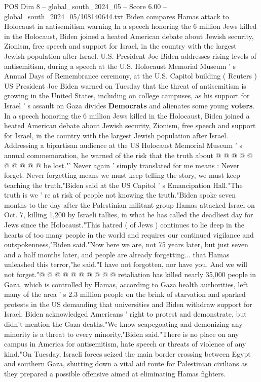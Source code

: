 \begin{textsample}{POS Dim 8 – global\_south\_2024\_05 – Score 6.00 – global\_south\_2024\_05/108140644.txt}  \label{ex:f8_pos_228}
Biden compares Hamas attack to Holocaust in antisemitism warning In a speech honoring the 6 million Jews killed in the Holocaust, Biden joined a heated American debate about Jewish security, Zionism, free speech and support for Israel, in the country with the largest Jewish population after Israel.
U.S.
President Joe Biden addresses rising levels of antisemitism, during a speech at the U.S.
Holocaust Memorial Museum ' s Annual Days of Remembrance ceremony, at the U.S.
Capitol building ( Reuters ) US President Joe Biden warned on Tuesday that the threat of antisemitism is growing in the United States, including on college campuses, as his support for Israel ' s assault on Gaza divides \textbf{Democrats} and alienates some young \textbf{voters}.
In a speech honoring the 6 million Jews killed in the Holocaust, Biden joined a heated American debate about Jewish security, Zionism, free speech and support for Israel, in the country with the largest Jewish population after Israel.
Addressing a bipartisan audience at the US Holocaust Memorial Museum ' s annual commemoration, he warned of the risk that the truth about @ @ @ @ @ @ @ @ @ @ be lost."' Never again ' simply translated for me means : Never forget.
Never forgetting means we must keep telling the story, we must keep teaching the truth,"Biden said at the US Capitol ' s Emancipation Hall."The truth is we ' re at risk of people not knowing the truth."Biden spoke seven months to the day after the Palestinian militant group Hamas attacked Israel on Oct. 7, killing 1,200 by Israeli tallies, in what he has called the deadliest day for Jews since the Holocaust."This hatred ( of Jews ) continues to lie deep in the hearts of too many people in the world and requires our continued vigilance and outspokenness,"Biden said."Now here we are, not 75 years later, but just seven and a half months later, and people are already forgetting... that Hamas unleashed this terror,"he said."I have not forgotten, nor have you.
And we will not forget."@ @ @ @ @ @ @ @ @ @ retaliation has killed nearly 35,000 people in Gaza, which is controlled by Hamas, according to Gaza health authorities, left many of the area ' s 2.3 million people on the brink of starvation and sparked protests in the US demanding that universities and Biden withdraw support for Israel.
Biden acknowledged Americans ' right to protest and demonstrate, but didn't mention the Gaza deaths."We know scapegoating and demonizing any minority is a threat to every minority,"Biden said."There is no place on any campus in America for antisemitism, hate speech or threats of violence of any kind."On Tuesday, Israeli forces seized the main border crossing between Egypt and southern Gaza, shutting down a vital aid route for Palestinian civilians as they prepared a possible offensive aimed at eliminating Hamas fighters.

\end{textsample}
